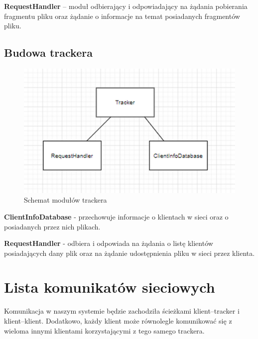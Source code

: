 \documentclass[11pt]{article}
\begin{document}
\textbf{RequestHandler} -- moduł odbierający i odpowiadający na żądania pobierania fragmentu pliku oraz żądanie o informacje na temat posiadanych fragmentów pliku. 

\clearpage
\subsection{Budowa trackera}
\begin{figure}[h]
\caption{Schemat modułów trackera}
\centering
\includegraphics[scale=0.4]{2}
\end{figure}

\textbf{ClientInfoDatabase} - przechowuje informacje o klientach w sieci oraz o posiadanych przez nich plikach.


\textbf{RequestHandler} - odbiera i odpowiada na żądania o listę klientów posiadających dany plik oraz na żądanie udostępnienia pliku w sieci przez klienta.

\section{Lista komunikatów sieciowych}
Komunikacja w naszym systemie będzie zachodziła ścieżkami klient--tracker i klient--klient. Dodatkowo, każdy klient może równolegle komunikować się z wieloma innymi klientami korzystającymi z tego samego trackera.
\end{document}
